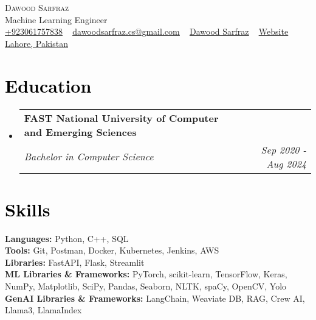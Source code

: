 \documentclass[letterpaper,11pt]{article}
\makeatletter
\newcommand{\resumeSubheading}[4]{
	\vspace{-2pt}\item
	\begin{tabular*}{1.0\textwidth}[t]{l@{\extracolsep{\fill}}r}
		\textbf{\large#1} & \textbf{\small #2} \\
		\textit{\large#3} & \textit{\small #4} \\
		
	\end{tabular*}\vspace{-7pt}
}
\newcommand{\resumeSubHeadingListStart}{\begin{itemize}[leftmargin=0.0in, label={}]}
\newcommand{\resumeSubHeadingListEnd}{\end{itemize}}
\makeatother
\begin{document}
	
	
	
	\begin{center}
		{\Huge \scshape Dawood Sarfraz} \\ \vspace{5pt}
		{\Large{Machine Learning Engineer}} \\ \vspace{5pt}
		\small 
		\href{tel:+9203061757838}{\raisebox{-0.1\height}{\faPhone} \underline{{+923061757838}}} ~ 
		\href{mailto:dawoodsarfraz.cs@gmail.com}{\raisebox{-0.2\height}{\faEnvelope} \underline{{dawoodsarfraz.cs@gmail.com}}} ~ 
		\href{https://linkedin.com/in/dawood-sarfraz-0466541b6}{\raisebox{-0.2\height}{\faLinkedin}  \underline{{Dawood Sarfraz}}} ~
		\href{https://dawoodsarfraz.github.io/web/}{\raisebox{-0.2\height}{\faGlobe} \underline{{Website}}}
		~ 
		\href{https://maps.app.goo.gl/DdjDSuGCuwkG288CA}{ \underline{{Lahore, Pakistan}}} 
		\vspace{-5pt}
	\end{center}
	
	
	\section{\textcolor{black}{Education}}
	\resumeSubHeadingListStart
	\resumeSubheading
	{FAST National University of Computer and Emerging Sciences}{}
	{Bachelor in Computer Science }{Sep 2020 - Aug 2024}
	\resumeSubHeadingListEnd
	\vspace{-10pt}

	\section{\textcolor{black}{Skills}}
	\begin{itemize}[leftmargin=0.01in, label={}]
		{\item{
				\textbf{\normalsize{Languages:}}{ \normalsize{Python, C++, SQL}} \\
				\textbf{\normalsize{Tools:}}{ \normalsize{Git, Postman, Docker, Kubernetes, Jenkins, AWS}} \\	
				\textbf{\normalsize{Libraries:}}{ \normalsize{FastAPI, Flask, Streamlit}}\\	
				\textbf{\normalsize{ML Libraries \& Frameworks:}}{ \normalsize{PyTorch, scikit-learn, TensorFlow, Keras, NumPy, Matplotlib, SciPy, Pandas, Seaborn, NLTK, spaCy, OpenCV, Yolo}} \\
				\textbf{\normalsize{GenAI Libraries \& Frameworks:}}{ \normalsize{LangChain, Weaviate DB, RAG, Crew AI, Llama3, LlamaIndex}} \\
		}}
	\end{itemize}
	\vspace{-10pt}
	
\end{document}
